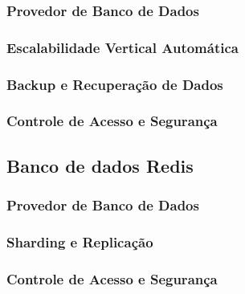 \subsubsection{Provedor de Banco de Dados}

\subsubsection{Escalabilidade Vertical Automática}

\subsubsection{Backup e Recuperação de Dados}

\subsubsection{Controle de Acesso e Segurança}

\subsection{Banco de dados Redis}

\subsubsection{Provedor de Banco de Dados}

\subsubsection{Sharding e Replicação}

\subsubsection{Controle de Acesso e Segurança}

